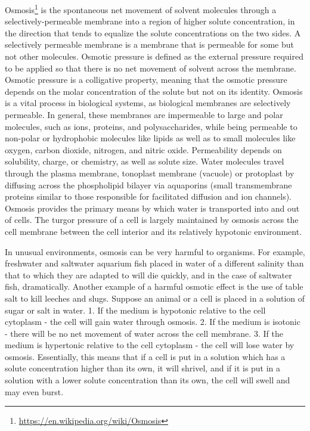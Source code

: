 \documentclass[]{book}
\let\rmarkdownfootnote\footnote%
\def\footnote{\protect\rmarkdownfootnote}
\renewcommand{\href}[2]{#2\footnote{\url{#1}}}
\begin{document}
\href{https://en.wikipedia.org/wiki/Osmosis}{Osmosis} is the spontaneous net movement of solvent molecules through a selectively-permeable membrane into a region of higher solute concentration, in the direction that tends to equalize the solute concentrations on the two sides. A selectively permeable membrane is a membrane that is permeable for some but not other molecules. Osmotic pressure is defined as the external pressure required to be applied so that there is no net movement of solvent across the membrane. Osmotic pressure is a colligative property, meaning that the osmotic pressure depends on the molar concentration of the solute but not on its identity.
Osmosis is a vital process in biological systems, as biological membranes are selectively permeable. In general, these membranes are impermeable to large and polar molecules, such as ions, proteins, and polysaccharides, while being permeable to non-polar or hydrophobic molecules like lipids as well as to small molecules like oxygen, carbon dioxide, nitrogen, and nitric oxide. Permeability depends on solubility, charge, or chemistry, as well as solute size. Water molecules travel through the plasma membrane, tonoplast membrane (vacuole) or protoplast by diffusing across the phospholipid bilayer via aquaporins (small transmembrane proteins similar to those responsible for facilitated diffusion and ion channels). Osmosis provides the primary means by which water is transported into and out of cells. The turgor pressure of a cell is largely maintained by osmosis across the cell membrane between the cell interior and its relatively hypotonic environment.

In unusual environments, osmosis can be very harmful to organisms. For example, freshwater and saltwater aquarium fish placed in water of a different salinity than that to which they are adapted to will die quickly, and in the case of saltwater fish, dramatically. Another example of a harmful osmotic effect is the use of table salt to kill leeches and slugs.
Suppose an animal or a cell is placed in a solution of sugar or salt in water.
1. If the medium is hypotonic relative to the cell cytoplasm - the cell will gain water through osmosis.
2. If the medium is isotonic - there will be no net movement of water across the cell membrane.
3. If the medium is hypertonic relative to the cell cytoplasm - the cell will lose water by osmosis.
Essentially, this means that if a cell is put in a solution which has a solute concentration higher than its own, it will shrivel, and if it is put in a solution with a lower solute concentration than its own, the cell will swell and may even burst.
\end{document}
